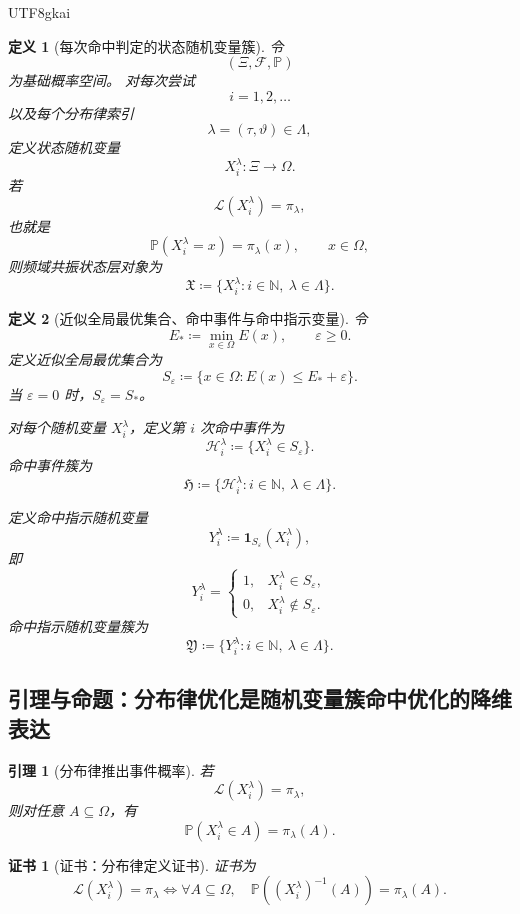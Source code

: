 \documentclass[12pt]{article}
\newtheorem{definition}{定义}[section]
\newtheorem{lemma}{引理}[section]
\newtheorem{Certificate}{证书}[section]
\newcommand{\NN}{\mathbb{N}}
\newcommand{\DefEq}{\coloneqq}
\begin{document}
\begin{CJK*}{UTF8}{gkai}
\begin{definition}[每次命中判定的状态随机变量簇]
\label{def:tex55-state-rv-cluster}
令
\[
  (\Xi,\mathcal F,\mathbb P)
\]
为基础概率空间。
对每次尝试
\[
  i=1,2,\ldots
\]
以及每个分布律索引
\[
  \lambda=(\tau,\vartheta)\in\Lambda,
\]
定义状态随机变量
\[
  X_i^\lambda:\Xi\to\Omega.
\]
若
\[
  \mathcal L(X_i^\lambda)=\pi_\lambda,
\]
也就是
\[
  \mathbb P(X_i^\lambda=x)=\pi_\lambda(x),
  \qquad
  x\in\Omega,
\]
则频域共振状态层对象为
\[
  \boxed{
  \mathfrak X
  \DefEq
  \{X_i^\lambda:i\in\NN,\ \lambda\in\Lambda\}.
  }
\]
\end{definition}

\begin{definition}[近似全局最优集合、命中事件与命中指示变量]
\label{def:tex55-hit-event-indicator}
令
\[
  E_*\DefEq\min_{x\in\Omega}E(x),
  \qquad
  \varepsilon\ge0.
\]
定义近似全局最优集合为
\[
  S_\varepsilon
  \DefEq
  \{x\in\Omega:E(x)\le E_*+\varepsilon\}.
\]
当 \(\varepsilon=0\) 时，\(S_\varepsilon=S_*\)。

对每个随机变量 \(X_i^\lambda\)，定义第 \(i\) 次命中事件为
\[
  \mathcal H_i^\lambda
  \DefEq
  \{X_i^\lambda\in S_\varepsilon\}.
\]
命中事件簇为
\[
  \boxed{
  \mathfrak H
  \DefEq
  \{\mathcal H_i^\lambda:i\in\NN,\ \lambda\in\Lambda\}.
  }
\]

定义命中指示随机变量
\[
  Y_i^\lambda
  \DefEq
  \mathbf 1_{S_\varepsilon}(X_i^\lambda),
\]
即
\[
  Y_i^\lambda=
  \begin{cases}
    1,&X_i^\lambda\in S_\varepsilon,\\
    0,&X_i^\lambda\notin S_\varepsilon.
  \end{cases}
\]
命中指示随机变量簇为
\[
  \boxed{
  \mathfrak Y
  \DefEq
  \{Y_i^\lambda:i\in\NN,\ \lambda\in\Lambda\}.
  }
\]
\end{definition}

\subsection{引理与命题：分布律优化是随机变量簇命中优化的降维表达}
\label{subsec:tex55-law-as-rv-projection}

\begin{lemma}[分布律推出事件概率]
\label{lem:tex55-law-event-probability}
若
\[
  \mathcal L(X_i^\lambda)=\pi_\lambda,
\]
则对任意 \(A\subseteq\Omega\)，有
\[
  \mathbb P(X_i^\lambda\in A)=\pi_\lambda(A).
\]
\end{lemma}

\begin{Certificate}[证书：分布律定义证书]
\label{cert:tex55-law-event-probability}
证书为
\[
  \mathcal L(X_i^\lambda)=\pi_\lambda
  \Longleftrightarrow
  \forall A\subseteq\Omega,\quad
  \mathbb P((X_i^\lambda)^{-1}(A))=\pi_\lambda(A).
\]
\end{Certificate}


\end{CJK*}
\end{document}
